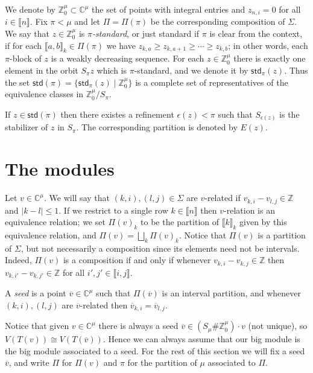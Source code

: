 \documentclass[11pt,fleqn]{amsart}
\newcommand\CC{\mathbb C}
\newcommand\ZZ{\mathbb Z}
\newcommand\std{\mathsf{std}}
\newcommand\vv{\overline{v}}
\newcommand\interval[1]{\llbracket #1 \rrbracket}
\begin{document}
We denote by $\ZZ^\mu_0 \subset \CC^\mu$ the set of points with integral 
entries and $z_{n,i} = 0$ for all $i \in \interval{n}$. Fix $\pi < \mu$ and 
let $\Pi = \Pi(\pi)$ be the corresponding composition of $\Sigma$. We say that 
$z \in \ZZ^\mu_0$ is \emph{$\pi$-standard}, or just standard if $\pi$ is 
clear from the context, if for each $\interval{a,b}_k \in \Pi(\pi)$ we have 
$z_{k,a} \geq z_{k,a+1} \geq \cdots \geq z_{k,b}$; in other words, each 
$\pi$-block of $z$ is a weakly decreasing sequence. For each $z \in \ZZ^\mu_0$
there is exactly one element in the orbit $S_\pi z$ which is $\pi$-standard, 
and we denote it by $\std_\pi(z)$. Thus the set $\std(\pi) = \{\std_\pi(z) 
\mid \ZZ^\mu_0\}$ is a complete set of representatives of the equivalence 
classes in $\ZZ^\mu_0 /S_\pi$. 

If $z \in \std(\pi)$ then there existes a refinement $\epsilon(z) < \pi$ 
such that $S_{\epsilon(z)}$ is the stabilizer of $z$ in $S_\pi$. The 
corresponding partition is denoted by $E(z)$. 


\section{The modules}
Let $v \in \CC^\mu$. We will say that $(k,i), (l,j) \in \Sigma$ are $v$-related
if $v_{k,i} - v_{l,j} \in \ZZ$ and $|k-l| \leq 1$. If we restrict to a single 
row $k \in \interval n$ then $v$-relation is an equivalence relation; we 
set $\Pi(v)_k$ to be the partition of $\interval{k}_k$ given by this 
equivalence relation, and $\Pi(v) = \bigsqcup_k \Pi(v)_k$. Notice that $\Pi(v)$
is a partition of $\Sigma$, but not necessarily a composition since its 
elements need not be intervals. Indeed, $\Pi(v)$ is a composition if and only 
if whenever $v_{k,i} - v_{k,j} \in \ZZ$ then $v_{k,i'} - v_{k,j'} \in \ZZ$
for all $i',j' \in \interval{i,j}$.

\begin{Definition}
A \emph{seed} is a point $\vv \in \CC^\mu$ such that $\Pi(\vv)$ is an interval 
partition, and whenever $(k,i), (l,j)$ are $\vv$-related then $\vv_{k,i} = 
\vv_{l,j}$.
\end{Definition}
Notice that given $v \in \CC^\mu$ there is always a seed $\vv \in (S_\mu \# 
\ZZ^\mu_0) \cdot v$ (not unique), so $V(T(v)) \cong V(T(\vv))$. Hence we can
always assume that our big module is the big module associated to a seed. 
For the rest of this section we will fix a seed $\vv$, and write $\Pi$ for 
$\Pi(v)$ and $\pi$ for the partition of $\mu$ associated to $\Pi$.



\begin{bibdiv}
\begin{biblist}
\end{biblist}
\end{bibdiv}
\end{document}
